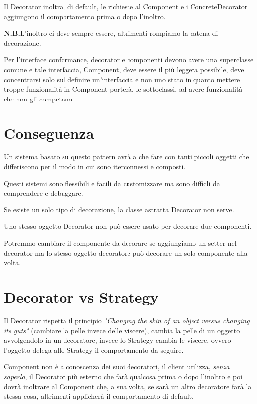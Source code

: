 Il Decorator inoltra, di default, le richieste al Component e i ConcreteDecorator aggiungono il comportamento prima o dopo l'inoltro.

\medskip
\textbf{N.B.}L'inoltro ci deve sempre essere, altrimenti rompiamo la catena di decorazione.
\medskip

Per l’interface conformance, decorator e componenti devono avere una superclasse comune e tale interfaccia, Component, deve essere il più leggera possibile, deve 
concentrarsi solo sul definire un'interfaccia e non uno stato in quanto mettere troppe funzionalità in Component porterà, le sottoclassi, ad avere funzionalità che 
non gli competono.

\section{Conseguenza}

Un sistema basato su questo pattern avrà a che fare con tanti piccoli oggetti che differiscono per il modo in cui sono iterconnessi e composti.

Questi sistemi sono flessibili e facili da customizzare ma sono difficli da comprendere e debuggare.

Se esiste un solo tipo di decorazione, la classe astratta Decorator non serve.

Uno stesso oggetto Decorator non può essere usato per decorare due componenti.

Potremmo cambiare il componente da decorare se aggiungiamo un setter nel decorator ma lo stesso oggetto decoratore può decorare un solo componente alla volta.

\section{Decorator vs Strategy}

Il Decorator rispetta il principio \textit{"Changing the skin of an object versus changing its guts"} (cambiare la pelle invece delle viscere), cambia la pelle di un 
oggetto avvolgendolo in un decoratore, invece lo Strategy cambia le viscere, ovvero l'oggetto delega allo Strategy il comportamento da seguire.

Component non è a conoscenza dei suoi decoratori, il client utilizza, \textit{senza saperlo}, il Decorator più esterno che farà qualcosa prima o dopo l'inoltro e poi 
dovrà inoltrare al Component che, a sua volta, se sarà un altro decoratore farà la stessa cosa, altrimenti applicherà il comportamento di default.

